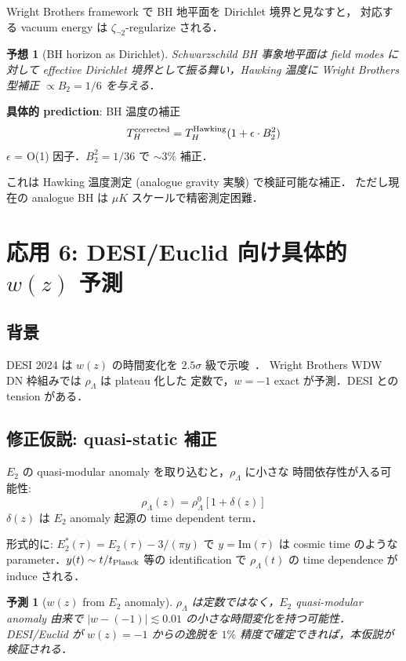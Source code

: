 \documentclass[11pt,a4paper]{article}
\newtheorem{conjecture}{予想}
\newtheorem{prediction}{予測}
\begin{document}
Wright Brothers framework で BH 地平面を Dirichlet 境界と見なすと，
対応する vacuum energy は $\zeta_{\neg 2}$-regularize される．

\begin{conjecture}[BH horizon as Dirichlet]
Schwarzschild BH 事象地平面は field modes に対して effective Dirichlet
境界として振る舞い，Hawking 温度に Wright Brothers 型補正
$\propto B_2 = 1/6$ を与える．
\end{conjecture}

\textbf{具体的 prediction}: BH 温度の補正
\begin{equation}
T_H^{\rm corrected} = T_H^{\rm Hawking}(1 + \epsilon \cdot B_2^2)
\end{equation}
$\epsilon$ = O(1) 因子．$B_2^2 = 1/36$ で $\sim 3\%$ 補正．

これは Hawking 温度測定 (analogue gravity 実験) で検証可能な補正．
ただし現在の analogue BH は $\mu K$ スケールで精密測定困難．

\section{応用 6: DESI/Euclid 向け具体的 $w(z)$ 予測}

\subsection{背景}

DESI 2024 は $w(z)$ の時間変化を $2.5\sigma$ 級で示唆~\cite{DESI2024}．
Wright Brothers WDW DN 枠組みでは $\rho_\Lambda$ は plateau 化した
定数で，$w = -1$ exact が予測．DESI との tension がある．

\subsection{修正仮説: quasi-static 補正}

$E_2$ の quasi-modular anomaly を取り込むと，$\rho_\Lambda$ に小さな
時間依存性が入る可能性:
\begin{equation}
\rho_\Lambda(z) = \rho_\Lambda^0 \left[1 + \delta(z)\right]
\end{equation}
$\delta(z)$ は $E_2$ anomaly 起源の time dependent term．

形式的に: $E_2^*(\tau) = E_2(\tau) - 3/(\pi y)$ で $y = \text{Im}(\tau)$
は cosmic time のような parameter．$y(t) \sim t/t_{\rm Planck}$ 等の
identification で $\rho_\Lambda(t)$ の time dependence が induce される．

\begin{prediction}[$w(z)$ from $E_2$ anomaly]
$\rho_\Lambda$ は定数ではなく，$E_2$ quasi-modular anomaly 由来で
$|w - (-1)| \lesssim 0.01$ の小さな時間変化を持つ可能性．DESI/Euclid が
$w(z) = -1$ からの逸脱を $1\%$ 精度で確定できれば，本仮説が検証される．
\end{prediction}
\end{document}
